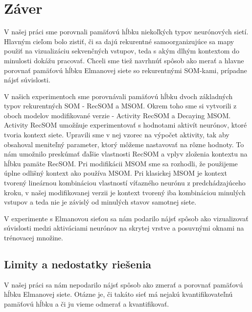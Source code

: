 \chapter*{Záver}
V našej práci sme porovnali pamäťovú hĺbku niekoľkých typov neurónových sietí.
Hlavným cieľom bolo zistiť, či sa dajú rekurentné samoorganizujúce sa mapy použiť na vizualizáciu
sekvenčných vstupov, teda s akým dlhým kontextom do minulosti dokážu pracovať. Chceli sme tiež navrhnúť 
spôsob ako merať a hlavne porovnať pamäťovú hĺbku Elmanovej siete so rekurentnými SOM-kami, prípadne 
nájsť súvislosti.

V našich experimentoch sme porovnávali pamäťovú hĺbku dvoch základných typov rekurentných 
SOM - RecSOM a MSOM. Okrem toho sme si vytvorili z oboch modelov modifikované verzie - Activity RecSOM a Decaying MSOM.
Activity RecSOM umožňuje experimentovať s hodnotami aktivít neurónov, ktoré tvoria kontext siete. Upravili sme v nej
vzorec na výpočet aktivity, tak aby obsahoval meniteľný parameter, ktorý môžeme nastavovať na rôzne hodnoty.
To nám umožnilo preskúmať ďaľšie vlastnosti RecSOM a vplyv zloženia kontextu na hĺbku pamäte RecSOM.
Pri modifikácii MSOM sme sa rozhodli, že použijeme úplne odlišný kontext ako používa MSOM. Pri klasickej MSOM
je kontext tvorený lineárnou kombináciou vlastností víťazného neurónu z predchádzajúceho kroku, v našej modifikovanej 
verzii je kontext tvorený iba kombináciou minulých vstupov a teda nie je závislý od minulých stavov samotnej siete.

V experimente s Elmanovou sieťou sa nám podarilo nájsť spôsob ako vizualizovať súvislosti medzi 
aktiváciami neurónov na skrytej vrstve a posuvnými oknami na trénovacej množine.

\section{Limity a nedostatky riešenia}
V našej práci sa nám nepodarilo nájsť spôsob ako zmerať a porovnať pamäťovú hĺbku Elmanovej siete.
Otázne je, či takáto sieť má nejakú kvantifikovateľnú pamäťovú hĺbku a či ju vieme odmerať a kvantifikovať.

